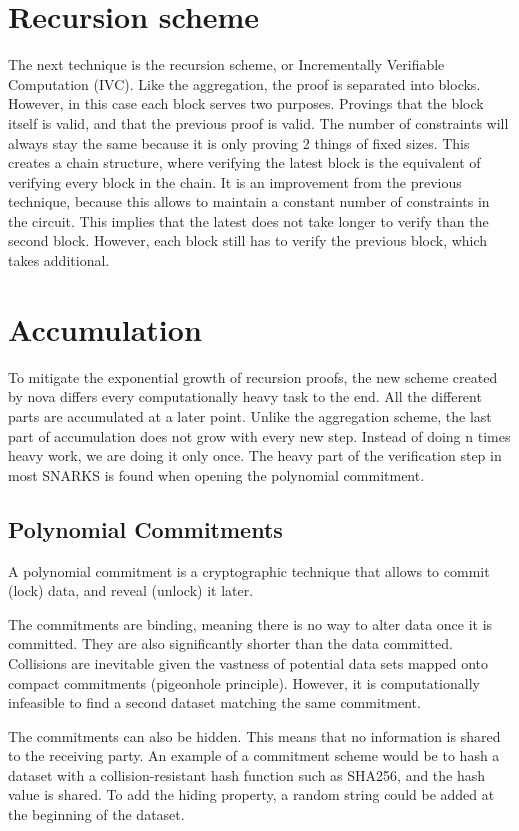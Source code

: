\section{Recursion scheme}
The next technique is the recursion scheme, or Incrementally Verifiable Computation (IVC). Like the aggregation, the proof is separated into blocks.
However, in this case each block serves two purposes. Provings that the block itself is valid, and that the previous proof is valid.
The number of constraints will always stay the same because it is only proving 2 things of fixed sizes. This creates
a chain structure, where verifying the latest block is the equivalent of verifying every block in the chain.
It is an improvement from the previous technique, because this allows to maintain a constant number of constraints in the circuit.
This implies that the latest does not take longer to verify than the second block.
However, each block still has to verify the previous block, which takes additional. \cite{Nova23}


\section{Accumulation}
To mitigate the exponential growth of recursion proofs, the new scheme created by nova differs every computationally heavy task to the end.
All the different parts are accumulated at a later point. Unlike the aggregation scheme, the last part of accumulation does not grow with every new step.
Instead of doing n times heavy work, we are doing it only once.
The heavy part of the verification step in most SNARKS is found when opening the polynomial commitment.


\subsection{Polynomial Commitments}
A polynomial commitment is a cryptographic technique that allows to commit (lock) data, and reveal (unlock) it later.

The commitments are binding, meaning there is no way to alter data once it is committed. They are also significantly shorter than
the data committed. Collisions are inevitable given the vastness of potential data sets mapped onto compact commitments (pigeonhole principle).
However, it is computationally infeasible to find a second dataset matching the same commitment.

The commitments can also be hidden. This means that no information is shared to the receiving party.
An example of a commitment scheme would be to hash a dataset with a collision-resistant hash function such as SHA256, and the hash value is shared.
To add the hiding property, a random string could be added at the beginning of the dataset.

